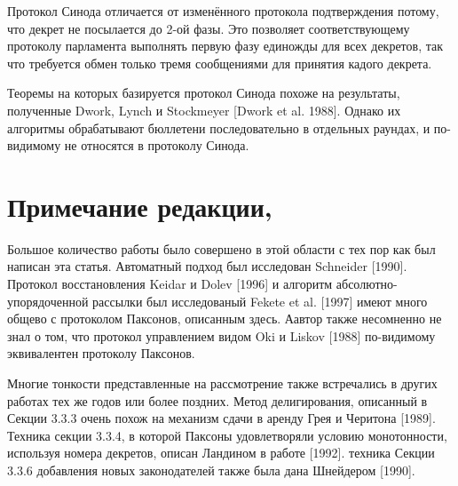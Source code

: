 \documentclass[12pt, a4paper]{article} %
\begin{document}
Протокол Синода отличается от изменённого протокола подтверждения потому, что декрет не посылается до 2-ой фазы. Это позволяет соответствующему протоколу парламента выполнять первую фазу единожды для всех декретов, так что требуется обмен только тремя сообщениями для принятия кадого декрета. 

Теоремы на которых базируется протокол Синода похоже на результаты, полученные Dwork, Lynch и Stockmeyer [Dwork et al. 1988]. Однако их алгоритмы обрабатывают бюллетени последовательно в отдельных раундах, и по-видимому не относятся в протоколу Синода.

\section{Примечание редакции,}
Большое количество работы было совершено в этой области с тех пор как был написан эта статья. Автоматный подход был исследован Schneider [1990]. Протокол восстановления Keidar и Dolev [1996] и алгоритм абсолютно-упорядоченной рассылки был исследованый Fekete et al. [1997] имеют много общево с протоколом Паксонов, описанным здесь. Аавтор также несомненно не знал о том, что протокол управлением видом Oki и Liskov [1988] по-видимому эквивалентен протоколу Паксонов.

Многие тонкости представленные на рассмотрение также встречались в других работах тех же годов или более поздних. Метод делигирования, описанный в Секции 3.3.3 очень похож на механизм сдачи в аренду Грея и Черитона [1989].  Техника секции 3.3.4, в которой Паксоны удовлетворяли условию монотонности, используя номера декретов, описан Ландином в работе [1992]. техника Секции 3.3.6 добавления новых законодателей также была дана Шнейдером [1990].
\end{document}
